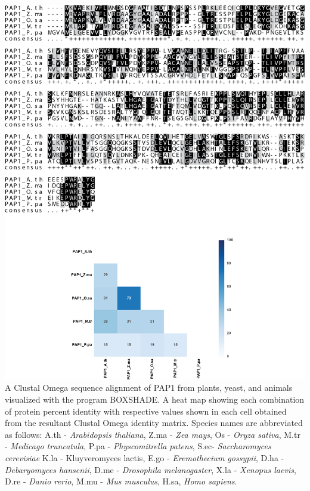 \begin{FPfigure}
	\centering
	\includegraphics[width=\columnwidth]{Proteasome/pap1align1.png}
	{A Clustal Omega \citep{sievers14} sequence alignment of PAP1 from plants, yeast, and animals visualized with the program BOXSHADE. A heat map showing each combination of protein percent identity with respective values shown in each cell obtained from the resultant Clustal Omega identity matrix. Species names are abbreviated as follows: A.th - \textit{Arabidopsis thaliana}, Z.ma - \textit{Zea mays}, Os - \textit{Oryza sativa}, M.tr - \textit{Medicago truncatula}, P.pa - \textit{Physcomitrella patens}, S.ec- \textit{Saccharomyces cerevisiae} K.la - {Kluyveromyces lactis}, E.go - \textit{Eremothecium gossypii}, D.ha - \textit{Debaryomyces hansenii}, D.me - \textit{Drosophila melanogaster}, X.la - \textit{Xenopus laevis}, D.re - \textit{Danio rerio}, M.mu - \textit{Mus musculus}, H.sa, \textit{Homo sapiens}.}
	\label{fig:pap1align}
\end{FPfigure}

